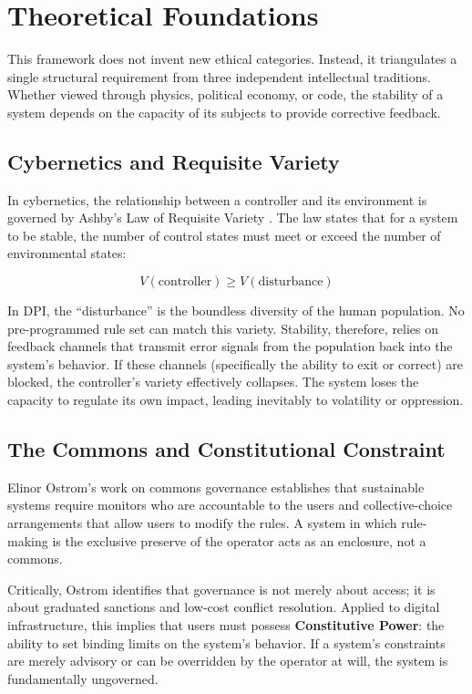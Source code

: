 \documentclass{article}
\begin{document}
\section{Theoretical Foundations}

This framework does not invent new ethical categories. Instead, it triangulates a single structural requirement from three independent intellectual traditions. Whether viewed through physics, political economy, or code, the stability of a system depends on the capacity of its subjects to provide corrective feedback.

\subsection{Cybernetics and Requisite Variety}

In cybernetics, the relationship between a controller and its environment is governed by Ashby's Law of Requisite Variety \citep{ashby1956}. The law states that for a system to be stable, the number of control states must meet or exceed the number of environmental states:

\begin{equation}
V(\text{controller}) \geq V(\text{disturbance})
\end{equation}

In DPI, the ``disturbance'' is the boundless diversity of the human population. No pre-programmed rule set can match this variety. Stability, therefore, relies on feedback channels that transmit error signals from the population back into the system's behavior. If these channels (specifically the ability to exit or correct) are blocked, the controller's variety effectively collapses. The system loses the capacity to regulate its own impact, leading inevitably to volatility or oppression.

\subsection{The Commons and Constitutional Constraint}

Elinor Ostrom's work on commons governance \citep{ostrom1990} establishes that sustainable systems require monitors who are accountable to the users and collective-choice arrangements that allow users to modify the rules. A system in which rule-making is the exclusive preserve of the operator acts as an enclosure, not a commons.

Critically, Ostrom identifies that governance is not merely about access; it is about graduated sanctions and low-cost conflict resolution. Applied to digital infrastructure, this implies that users must possess \textbf{Constitutive Power}: the ability to set binding limits on the system's behavior. If a system's constraints are merely advisory or can be overridden by the operator at will, the system is fundamentally ungoverned.
\end{document}
